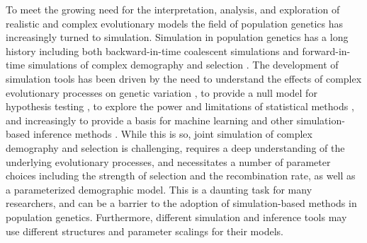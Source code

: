 \documentclass[hidelinks]{article}
\begin{document}
    To meet the growing need for the interpretation,
    analysis, and exploration of realistic and complex evolutionary models
    the field of population genetics has increasingly turned to simulation.
    Simulation in population genetics has a long history 
    including both backward-in-time coalescent simulations
    \citep{kingman1982genealogy,hudson1983testing, hudson1990gene}
    and forward-in-time simulations of complex demography and selection
    \citep[e.g.,][]{gillespie1984molecular,thornton2014c++, haller2019slim}.
    The development of simulation tools has been driven by the need to
    understand the effects of complex evolutionary processes on genetic
    variation \citep[e.g.,][]{galloway2020few}, to provide a null model for hypothesis testing
    \citep[e.g.,][]{hudson1992statistical,hudson1994evidence,sabeti2002detecting},
    to explore the power and limitations of statistical methods \citep[e.g.,][]{przeworski2002signature},
    and increasingly to provide a basis for machine learning and other
    simulation-based inference methods \citep[e.g.,][]{beaumont2002approximate,pavlidis2010searching,lin2011distinguishing,kern2018diplos,mughal2019localizing,sanchez2021deep,wang2021automatic}.
    While this is so, joint simulation of complex demography and selection
    is challenging,  requires a deep understanding of the underlying
    evolutionary processes, and necessitates a number of parameter choices including
    the strength of selection and the
    recombination rate, as well as a parameterized demographic model.
    This is a daunting task for many researchers, and can be a barrier to
    the adoption of simulation-based methods in population genetics.
    Furthermore, different simulation and inference tools may use different structures
    and parameter scalings for their models.
\end{document}
